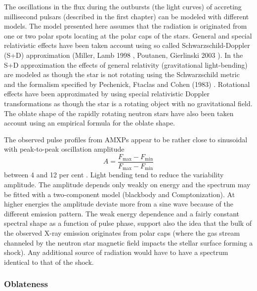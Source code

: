 \documentclass{wihuri}
\def\be{\begin{equation}}
\def\ee{\end{equation}}
\begin{document}
The oscillations in the flux during the outbursts (the light curves) of accreting millisecond pulsars (described in the first chapter) can be modeled with different models. The model presented here assumes that the radiation is originated from one or two polar spots locating at the polar caps of the stars. General and special relativistic effects have been taken account using so called Schwarzschild-Doppler (S+D) approximation (Miller, Lamb 1998 \cite{millerlamb98}%
, Poutanen, Gierlinski 2003 \cite{poutagierlinskisax}). In the S+D approximation the effects of general relativity (gravitational light-bending) are modeled as though the star is not rotating using the Schwarzschild metric and the formalism specified by
Pechenick, Ftaclas and Cohen (1983) \cite{pechenick}. Rotational effects have been approximated by using special relativistic Doppler transformations as though the star is a rotating object with no gravitational field. The oblate shape of the rapidly rotating neutron stars have also been taken account using an empirical formula for the oblate shape.


The observed pulse profiles from AMXPs appear to be rather close to sinusoidal with peak-to-peak oscillation amplitude 
\be \label{eq:amplitude}
A = \frac{F_{\mathrm{max}} - F_{\mathrm{min}}} {F_{\mathrm{max}} - F_{\mathrm{min}}}
\ee %
 between 4 and 12 per cent \cite{poutarew2006}. Light bending tend to reduce the variability amplitude. The amplitude depends only weakly on energy and the spectrum may be fitted with a two-component model (blackbody and Comptonization). At higher energies the amplitude deviate more from a sine wave because of the different emission pattern. The weak energy dependence and a fairly constant spectral shape as a function of pulse phase, support also the idea that the bulk of the observed X-ray emission originates from polar caps (where the gas stream channeled by the neutron star magnetic field impacts the stellar surface forming a shock). Any additional source of radiation would have to have a spectrum identical to that of the shock.


\subsubsection{Oblateness}
\end{document}
